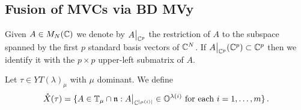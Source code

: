 \documentclass{article} %
\begin{document}
% 

% 
% 
% 
% 

% 
% 
% 
\subsection{Fusion of MVCs via BD MVy}


Given $A \in M_N(\mathbb C)$ we denote by $A\big|_{\mathbb C^p}$ the restriction of $A$ to the subspace spanned by the first $p$ standard basis vectors of $\mathbb C^N$.  If $A\big|_{\mathbb C^p}(\mathbb C^p)\subset\mathbb C^p$ then we identify it with the $p\times p$ upper-left submatrix of $A$. 

Let $\tau\in YT(\lambda)_\mu$ with $\mu$ dominant. 
We define
\[
\mathring X(\tau) = 
    \{
        A \in  \mathbb T_\mu\cap\mathfrak n : A\big|_{\mathbb C^{|\mu(i)|}} \in \mathbb O^{\lambda(i)} \text{ for each } i = 1,\dots,m
    \}\,.
\]
\end{document}
